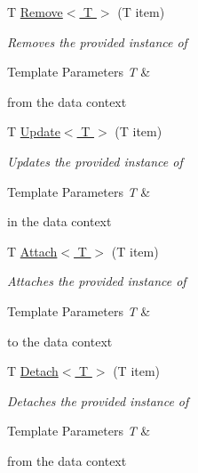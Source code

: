 \begin{DoxyCompactItemize}
\item 
T \hyperlink{class_highway_1_1_data_1_1_entity_framework_1_1_tests_1_1_unit_tests_1_1_e_f_failure_context_a0a0f27c69dbe3c1e5adab1f560f75ee9}{Remove$<$ T $>$} (T item)
\begin{DoxyCompactList}\small\item\em Removes the provided instance of 
\begin{DoxyTemplParams}{Template Parameters}
{\em T} & \\
\hline
\end{DoxyTemplParams}
from the data context \end{DoxyCompactList}\item 
T \hyperlink{class_highway_1_1_data_1_1_entity_framework_1_1_tests_1_1_unit_tests_1_1_e_f_failure_context_a2a82171e665c27272dd5814deb80aa89}{Update$<$ T $>$} (T item)
\begin{DoxyCompactList}\small\item\em Updates the provided instance of 
\begin{DoxyTemplParams}{Template Parameters}
{\em T} & \\
\hline
\end{DoxyTemplParams}
in the data context \end{DoxyCompactList}\item 
T \hyperlink{class_highway_1_1_data_1_1_entity_framework_1_1_tests_1_1_unit_tests_1_1_e_f_failure_context_adc619f2f1b000d97cf4de4e48b364805}{Attach$<$ T $>$} (T item)
\begin{DoxyCompactList}\small\item\em Attaches the provided instance of 
\begin{DoxyTemplParams}{Template Parameters}
{\em T} & \\
\hline
\end{DoxyTemplParams}
to the data context \end{DoxyCompactList}\item 
T \hyperlink{class_highway_1_1_data_1_1_entity_framework_1_1_tests_1_1_unit_tests_1_1_e_f_failure_context_a3b383183286a91ada493aa4725c5adb7}{Detach$<$ T $>$} (T item)
\begin{DoxyCompactList}\small\item\em Detaches the provided instance of 
\begin{DoxyTemplParams}{Template Parameters}
{\em T} & \\
\hline
\end{DoxyTemplParams}
from the data context \end{DoxyCompactList}\item 

\end{DoxyCompactItemize}
